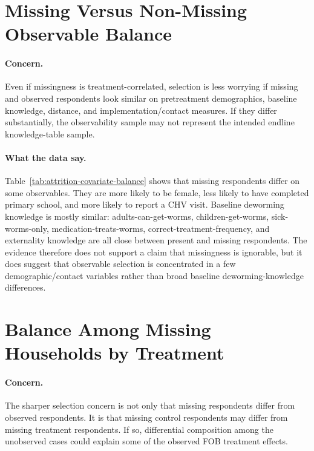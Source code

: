 \documentclass[11pt]{article}
\begin{document}
\section{Missing Versus Non-Missing Observable Balance}

\paragraph{Concern.}
Even if missingness is treatment-correlated, selection is less worrying if missing and observed respondents look similar on pretreatment demographics, baseline knowledge, distance, and implementation/contact measures. If they differ substantially, the observability sample may not represent the intended endline knowledge-table sample.

\begin{table}[!htbp]
\centering
\caption{Observable balance between respondents present and missing from the knowledge table}
\label{tab:attrition-covariate-balance}

\end{table}
\FloatBarrier

\paragraph{What the data say.}
Table~\ref{tab:attrition-covariate-balance} shows that missing respondents differ on some observables. They are more likely to be female, less likely to have completed primary school, and more likely to report a CHV visit. Baseline deworming knowledge is mostly similar: adults-can-get-worms, children-get-worms, sick-worms-only, medication-treats-worms, correct-treatment-frequency, and externality knowledge are all close between present and missing respondents. The evidence therefore does not support a claim that missingness is ignorable, but it does suggest that observable selection is concentrated in a few demographic/contact variables rather than broad baseline deworming-knowledge differences.

\section{Balance Among Missing Households by Treatment}

\paragraph{Concern.}
The sharper selection concern is not only that missing respondents differ from observed respondents. It is that missing control respondents may differ from missing treatment respondents. If so, differential composition among the unobserved cases could explain some of the observed FOB treatment effects.
\end{document}
